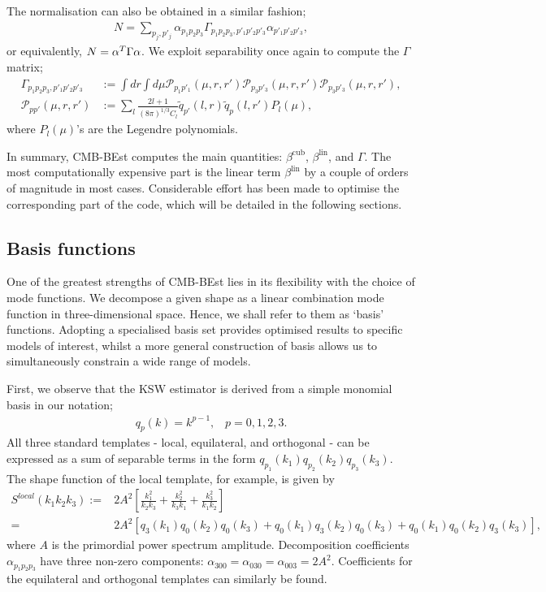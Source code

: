 The normalisation can also be obtained in a similar fashion;
\begin{align}
	N = \sum_{p_j, p'_j} \alpha_{p_1 p_2 p_3} \Gamma_{p_1 p_2 p_3, p'_1 p'_2 p'_3} \alpha_{p'_1 p'_2 p'_3}, \label{eqn:normlisation_from_gamma}
\end{align}
or equivalently, $N = \mathbf{\alpha}^T \Gamma \mathbf{\alpha}$. We exploit separability once again to compute the $\Gamma$ matrix;
\begin{align}
	\Gamma_{p_1 p_2 p_3, p'_1 p'_2 p'_3} &:= \int dr \int d\mu \mathcal{P}_{p_1 p'_1}(\mu, r, r') \mathcal{P}_{p_3 p'_3}(\mu, r, r') \mathcal{P}_{p_3 p'_3}(\mu, r, r'), 	\label{def:gamma} 	\\
	\mathcal{P}_{p p'}(\mu, r, r') &:= \sum_l \frac{2l+1}{(8\pi)^{1/3} C_l} \tilde{q}_{p'}(l,r) \tilde{q}_p(l,r') P_l(\mu),
\end{align}
where $P_l(\mu)$'s are the Legendre polynomials.

In summary, CMB-BEst computes the main quantities: $\beta^\text{cub}$, $\beta^\text{lin}$, and $\Gamma$. The most computationally expensive part is the linear term $\beta^\text{lin}$ by a couple of orders of magnitude in most cases. Considerable effort has been made to optimise the corresponding part of the code, which will be detailed in the following sections.

\subsection{Basis functions} \label{section:basis_functions}

One of the greatest strengths of CMB-BEst lies in its flexibility with the choice of mode functions. We decompose a given shape as a linear combination mode function in three-dimensional space. Hence, we shall refer to them as `basis' functions. Adopting a specialised basis set provides optimised results to specific models of interest, whilst a more general construction of basis allows us to simultaneously constrain a wide range of models.

First, we observe that the KSW estimator \cite{Komatsu2005} is derived from a simple monomial basis in our notation;
\begin{align}
	q_p(k) = k^{p-1}, \;\;\; p = 0, 1, 2, 3.
\end{align}
All three standard templates - local, equilateral, and orthogonal - can be expressed as a sum of separable terms in the form $q_{p_1}(k_1) q_{p_2}(k_2) q_{p_3}(k_3)$. The shape function of the local template, for example, is given by
\begin{align}
	S^{local}(k_1 k_2 k_3) :=& 2A^2 \left[ \frac{k_1^2}{k_2 k_3} + \frac{k_2^2}{k_3 k_1} + \frac{k_3^2}{k_1 k_2}  \right] \\
	=& 2A^2 \left[q_3(k_1)q_0(k_2)q_0(k_3) + q_0(k_1)q_3(k_2)q_0(k_3) + q_0(k_1)q_0(k_2)q_3(k_3) \right],
\end{align}
where $A$ is the primordial power spectrum amplitude. Decomposition coefficients $\alpha_{p_1 p_2 p_3}$ have three non-zero components: $\alpha_{300} = \alpha_{030} = \alpha_{003} = 2A^2$. Coefficients for the equilateral and orthogonal templates can similarly be found.

